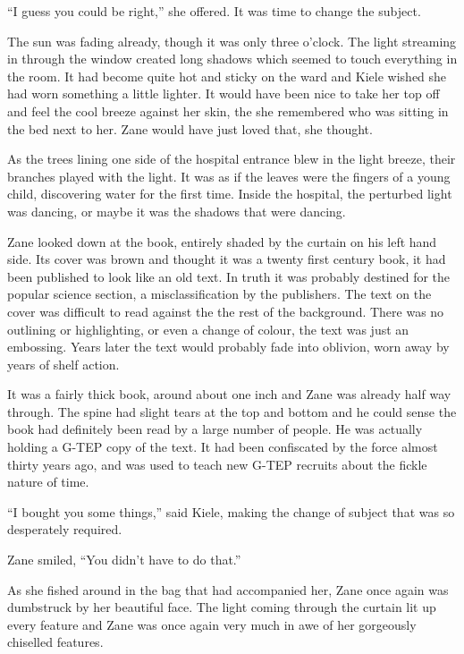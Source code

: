 ``I guess you could be right,'' she offered.  It was time to change the subject.  

The sun was fading already, though it was only three o'clock.  The light streaming in through the window created long shadows which seemed to touch everything in the room.  It had become quite hot and sticky on the ward and Kiele wished she had worn something a little lighter.  It would have been nice to take her top off and feel the cool breeze against her skin, the she remembered who was sitting in the bed next to her.  Zane would have just loved that, she thought.  

As the trees lining one side of the hospital entrance blew in the light breeze, their branches played with the light.  It was as if the leaves were the fingers of a young child, discovering water for the first time.  Inside the hospital, the perturbed light was dancing, or maybe it was the shadows that were dancing.

Zane looked down at the book, entirely shaded by the curtain on his left hand side.  Its cover was brown and thought it was a twenty first century book, it had been published to look like an old text.  In truth it was probably destined for the popular science section, a misclassification by the publishers.  The text on the cover was difficult to read against the the rest of the background.  There was no outlining or highlighting, or even a change of colour, the text was just an embossing.  Years later the text would probably fade into oblivion, worn away by years of shelf action.

It was a fairly thick book, around about one inch and Zane was already half way through.  The spine had slight tears at the top and bottom and he could sense the book had definitely been read by a large number of people.  He was actually holding a G-TEP copy of the text.  It had been confiscated by the force almost thirty years ago, and was used to teach new G-TEP recruits about the fickle nature of time.  

``I bought you some things,'' said Kiele, making the change of subject that was so desperately required.

Zane smiled, ``You didn't have to do that.''  

As she fished around in the bag that had accompanied her, Zane once again was dumbstruck by her beautiful face.  The light coming through the curtain lit up every feature and Zane was once again very much in awe of her gorgeously chiselled features.

